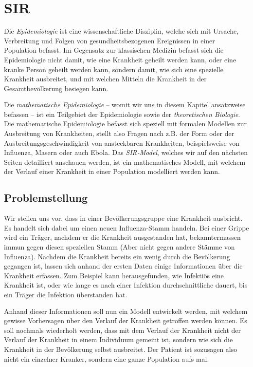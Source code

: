 \chapter{SIR\label{chapter:sir}}
\begin{refsection}

Die \emph{Epidemiologie} ist eine wissenschaftliche Disziplin, welche sich mit Ursache, Verbreitung und Folgen von gesundheitsbezogenen Ereignissen in einer Population befasst.
Im Gegensatz zur klassischen Medizin befasst sich die Epidemiologie nicht damit, wie eine Krankheit geheilt werden kann, oder eine kranke Person geheilt werden kann, sondern damit, wie sich eine spezielle Krankheit ausbreitet, und mit welchen Mitteln die Krankheit in der Gesamtbevölkerung besiegen kann.

Die \emph{mathematische Epidemiologie} -- womit wir uns in diesem Kapitel ansatzweise befassen -- ist ein Teilgebiet der Epidemiologie sowie der \emph{theoretischen Biologie}.
Die mathematische Epidemiologie befasst sich speziell mit formalen Modellen zur Ausbreitung von Krankheiten, stellt also Fragen nach z.B. der Form oder der Ausbreitungsgeschwindigkeit von ansteckbaren Krankheiten, beispielsweise von Influenza, Masern oder auch Ebola. 
Das \emph{SIR-Model}, welches wir auf den nächsten Seiten detailliert anschauen werden, ist ein mathematisches Modell, mit welchem der Verlauf einer Krankheit in einer Population modelliert werden kann.

\section{Problemstellung}
Wir stellen uns vor, dass in einer Bevölkerungsgruppe eine Krankheit ausbricht. 
Es handelt sich dabei um einen neuen Influenza-Stamm handeln.
Bei einer Grippe wird ein Träger, nachdem er die Krankheit ausgestanden hat, bekanntermassen immun gegen diesen speziellen Stamm (Aber nicht gegen andere Stämme von Influenza).
Nachdem die Krankheit bereits ein wenig durch die Bevölkerung gegangen ist, lassen sich anhand der ersten Daten einige Informationen über die Krankheit erfassen.
Zum Beispiel kann herausgefunden, wie Infektiös eine Krankheit ist, oder wie lange es nach einer Infektion durchschnittliche dauert, bis ein Träger die Infektion überstanden hat.

Anhand dieser Informationen soll nun ein Modell entwickelt werden, mit welchem gewisse Vorhersagen über den Verlauf der Krankheit getroffen werden können. 
Es soll nochmals wiederholt werden, dass mit dem Verlauf der Krankheit nicht der Verlauf der Krankheit in einem Individuum gemeint ist, sondern wie sich die Krankheit in der Bevölkerung selbst ausbreitet. 
Der Patient ist sozusagen also nicht ein einzelner Kranker, sondern eine ganze Population aufs mal.


\end{refsection}
